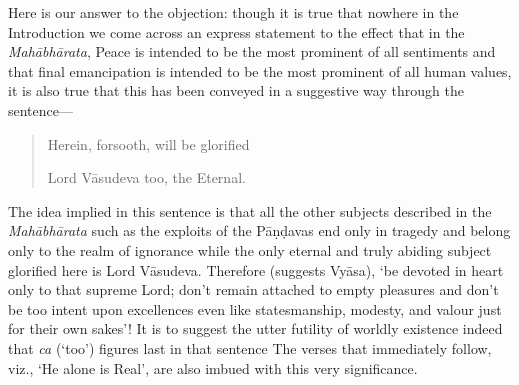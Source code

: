 \documentclass[12pt]{book}
\begin{document}
Here is our answer to the objection: though it is true that
nowhere in the Introduction we come across an express statement
to the effect that in the \textit{Mahābhārata}, Peace is intended to be
the most prominent of all sentiments and that final emancipation
is intended to be the most prominent of all human values, it is
also true that this has been conveyed in a suggestive way through
the sentence—

\begin{quotation}
\begin{em}
Herein, forsooth, will be glorified

Lord Vāsudeva too, the Eternal.
\end{em}
\end{quotation}

The idea implied in this sentence is that all the other
subjects described in the \textit{Mahābhārata} such as the exploits of the
Pāṇḍavas end only in tragedy and belong only to the realm of
ignorance while the only eternal and truly abiding subject
glorified here is Lord Vāsudeva. Therefore (suggests Vyāsa),
`be devoted in heart only to that supreme Lord; don't remain
attached to empty pleasures and don't be too intent upon
excellences even like statesmanship, modesty, and valour just for
their own sakes'! It is to suggest the utter futility of worldly
existence indeed that \textit{ca} (`too') figures last in that sentence
The verses that immediately follow, viz., `He alone is Real', are
also imbued with this very significance.
\end{document}
